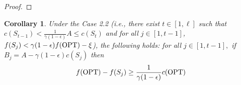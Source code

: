 \documentclass[10pt]{article} %
\newtheorem{corollary}[theorem]{Corollary}
\theoremstyle{remark}
\newcommand{\OPT}{{\rm OPT}}
\begin{document}
\begin{proof}
    
\end{proof}
   
\begin{corollary} 
\label{col:lower-opt-approx}
Under the Case 2.2 (i.e., 
there exist $t\in[1, \ell]$ such that
$c(S_{t-1})< \frac{1}{\gamma (1-\epsilon)} A  \leq c(S_t)$
and for all $j\in[1, t-1]$, $f(S_{j}) < \gamma (1-\epsilon)f(\OPT) - \xi$), the following holds: 
for all $j \in  [1, t-1],$ %
if $B_j=A-\gamma(1-\epsilon) c(S_{j})$ then \[f(\OPT) -f(S_{j}) \geq \displaystyle\frac{1}{\gamma(1-\epsilon)}c(\OPT)\]
\end{corollary}
\end{document}
